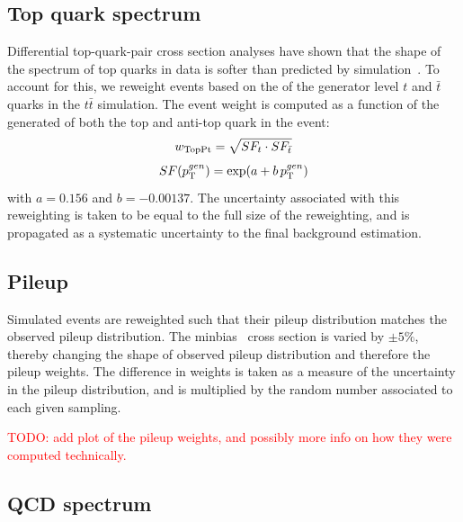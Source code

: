 \subsection{Top quark \texorpdfstring{\pt}{pT} spectrum} 

Differential top-quark-pair cross section analyses have shown that the shape of the \pt spectrum of 
top quarks in data is softer than predicted by simulation~\cite{toppt,toppt_twiki}. 
To account for this, we reweight events based on the \pt of the generator level $t$ and $\bar{t}$
quarks in the $t\bar{t}$ simulation.  
The event weight is computed as a function of the generated \pt of both the top and anti-top quark
in the event: 
\begin{equation}
w_{\rm TopPt} = \sqrt{ SF_t \cdot SF_{\bar{t}} }
\end{equation}
\begin{equation}
SF(p_{\mathrm{T}}^{gen}) = \exp(a + b\, p_{\mathrm{T}}^{gen})
\end{equation}
with $a = 0.156$ and $b = -0.00137$.
The uncertainty associated with this reweighting is taken to be equal to the full size of the
reweighting, and is propagated as a systematic uncertainty to the final background estimation. 

\subsection{Pileup} 

Simulated events are reweighted such that their pileup distribution matches the observed pileup
distribution. The minbias~\cite{Field:2012jv} cross section is varied by
$\pm 5\%$, thereby changing the shape of observed pileup distribution and therefore the
pileup weights. The difference in weights is taken as a measure of the uncertainty in the pileup
distribution, and is multiplied by the random number associated to each given sampling.  

\textcolor{red}{TODO: add plot of the pileup weights, and possibly more info on how they were
computed technically.}

\subsection{QCD spectrum} 


